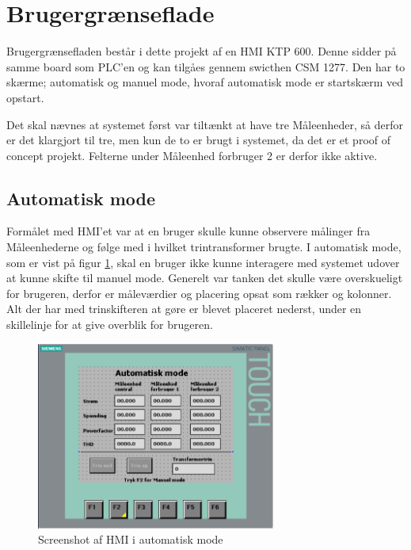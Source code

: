 
\section{Brugergrænseflade}
\label{sec:HMI}

Brugergrænsefladen består i dette projekt af en HMI KTP 600. Denne sidder på samme board som PLC'en og kan tilgåes gennem swicthen CSM 1277. Den har to skærme; automatisk og manuel mode, hvoraf automatisk mode er startskærm ved opstart.


Det skal nævnes at systemet først var tiltænkt at have tre Måleenheder, så derfor er det klargjort til tre, men kun de to er brugt i systemet, da det er et proof of concept projekt. Felterne under Måleenhed forbruger 2 er derfor ikke aktive.

\subsection{Automatisk mode}

Formålet med HMI'et var at en bruger skulle kunne observere målinger fra Måleenhederne og følge med i hvilket trintransformer brugte. I automatisk mode, som er vist på figur \ref{fig:HMIAutomatiskModeDesign}, skal en bruger ikke kunne interagere med systemet udover at kunne skifte til manuel mode.
Generelt var tanken det skulle være overskueligt for brugeren, derfor er måleværdier og placering opsat som rækker og kolonner. Alt der har med trinskifteren at gøre er blevet placeret nederst, under en skillelinje for at give overblik for brugeren.

\begin{figure}[H] %
	\centering
	\includegraphics[width=0.7\textwidth]{Figure/HMIAutomatiskModeDesign}
	\caption{Screenshot af HMI i automatisk mode}
	\label{fig:HMIAutomatiskModeDesign}
\end{figure}

